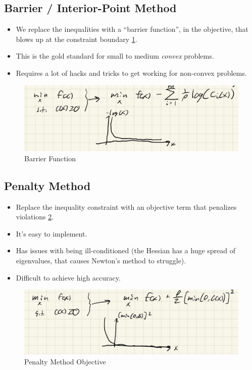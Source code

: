 \subsection{Barrier / Interior-Point Method}
\begin{itemize}
    \item We replace the inequalities with a ``barrier function'', in the objective, that blows up at the constraint boundary \cref{fig:l4f2}.
    \item This is the gold standard for small to medium \textit{convex} problems.
    \item Requires a lot of hacks and tricks to get working for non-convex problems.
\end{itemize}
\begin{figure}
    \centering
    \includegraphics[width=0.4\linewidth]{L4_Images/I2.PNG}
    \caption{Barrier Function}
    \label{fig:l4f2}
\end{figure}

\subsection{Penalty Method}
\begin{itemize}
    \item Replace the inequality constraint with an objective term that penalizes violations \cref{fig:l4f3}.
    \item It's easy to implement. 
    \item Has issues with being ill-conditioned (the Hessian has a huge spread of eigenvalues, that causes Newton's method to struggle). 
    \item Difficult to achieve high accuracy.
\end{itemize}
\begin{figure}
    \centering
    \includegraphics[width=0.4\linewidth]{L4_Images/I3.PNG}
    \caption{Penalty Method Objective}
    \label{fig:l4f3}
\end{figure}

